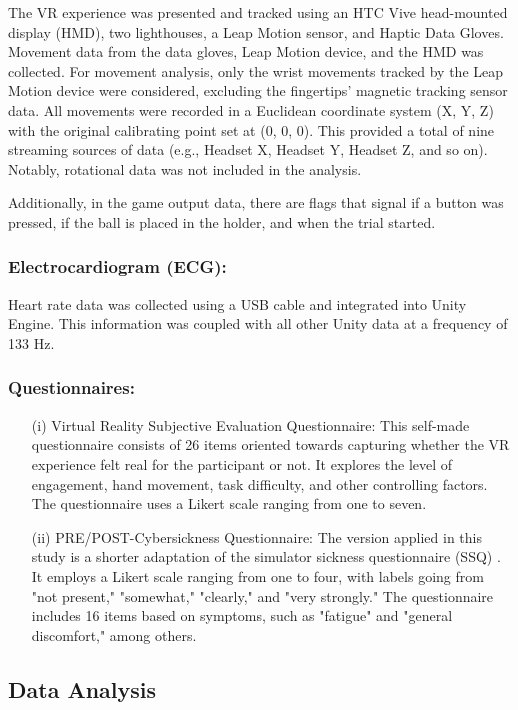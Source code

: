 \documentclass[12pt,oneside,openright]{report}
\begin{document}
The VR experience was presented and tracked using an HTC Vive head-mounted display (HMD), two lighthouses, a Leap Motion sensor, and Haptic Data Gloves. Movement data from the data gloves, Leap Motion device, and the HMD was collected. For movement analysis, only the wrist movements tracked by the Leap Motion device were considered, excluding the fingertips' magnetic tracking sensor data. All movements were recorded in a Euclidean coordinate system (X, Y, Z) with the original calibrating point set at (0, 0, 0). This provided a total of nine streaming sources of data (e.g., Headset X, Headset Y, Headset Z, and so on). Notably, rotational data was not included in the analysis.

Additionally, in the game output data, there are flags that signal if a button was pressed, if the ball is placed in the holder, and when the trial started.

\subsubsection*{Electrocardiogram (ECG):}

Heart rate data was collected using a USB cable and integrated into Unity Engine. This information was coupled with all other Unity data at a frequency of 133 Hz.

\subsubsection*{Questionnaires:}

\begin{enumerate}
\item[(i)] Virtual Reality Subjective Evaluation Questionnaire: This self-made questionnaire consists of 26 items oriented towards capturing whether the VR experience felt real for the participant or not. It explores the level of engagement, hand movement, task difficulty, and other controlling factors. The questionnaire uses a Likert scale ranging from one to seven.
\item[(ii)] PRE/POST-Cybersickness Questionnaire: The version applied in this study is a shorter adaptation of the simulator sickness questionnaire (SSQ) \parencite*{avpsy}. It employs a Likert scale ranging from one to four, with labels going from "not present," "somewhat," "clearly," and "very strongly." The questionnaire includes 16 items based on symptoms, such as "fatigue" and "general discomfort," among others.
\end{enumerate}
    \subsection*{Data Analysis}
\end{document}
